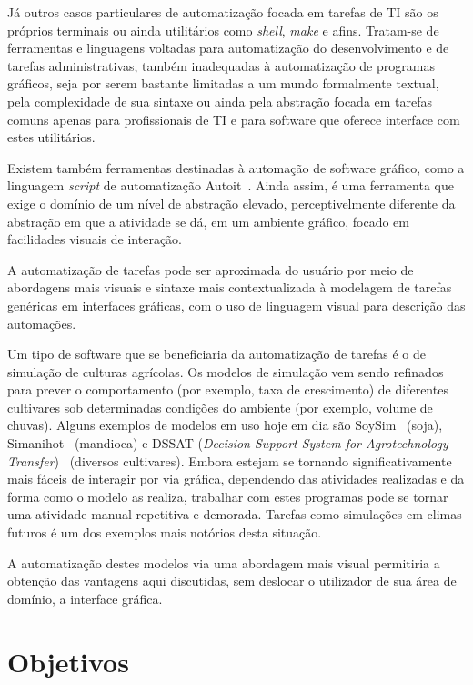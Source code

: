 \documentclass[12pt]{article}
\begin{document}
        Já outros casos particulares de automatização focada em tarefas de TI são os próprios terminais ou ainda utilitários como \emph{shell},  \emph{make} e afins. Tratam-se de ferramentas e linguagens voltadas para automatização do desenvolvimento e de tarefas administrativas, também inadequadas à automatização de programas gráficos, seja por serem bastante limitadas a um mundo formalmente textual, pela complexidade de sua sintaxe ou ainda pela abstração focada em tarefas comuns apenas para profissionais de TI e para software que oferece interface com estes utilitários.

        Existem também ferramentas destinadas à automação de software gráfico, como a linguagem \emph{script} de automatização Autoit~\cite{autoit}. Ainda assim, é uma ferramenta que exige o domínio de um nível de abstração elevado, perceptivelmente diferente da abstração em que a atividade se dá, em um ambiente gráfico, focado em facilidades visuais de interação.

        A automatização de tarefas pode ser aproximada do usuário por meio de abordagens mais visuais e sintaxe mais contextualizada à modelagem de tarefas genéricas em interfaces gráficas, com o uso de linguagem visual para descrição das automações.

        Um tipo de software que se beneficiaria da automatização de tarefas é o de simulação de culturas agrícolas. Os modelos de simulação vem sendo refinados para prever o comportamento (por exemplo, taxa de crescimento) de diferentes cultivares sob determinadas condições do ambiente (por exemplo, volume de chuvas). Alguns exemplos de modelos em uso hoje em dia são SoySim~\cite{SoySim} (soja), Simanihot~\cite{Simanihot} (mandioca) e DSSAT (\emph{Decision Support System for Agrotechnology Transfer})~\cite{dssat} (diversos cultivares). Embora estejam se tornando significativamente mais fáceis de interagir por via gráfica, dependendo das atividades realizadas e da forma como o modelo as realiza, trabalhar com estes programas pode se tornar uma atividade manual repetitiva e demorada. Tarefas como simulações em climas futuros é um dos exemplos mais notórios desta situação.

        A automatização destes modelos via uma abordagem mais visual permitiria a obtenção das vantagens aqui discutidas, sem deslocar o utilizador de sua área de domínio, a interface gráfica.

    	\section{Objetivos}
\end{document}
